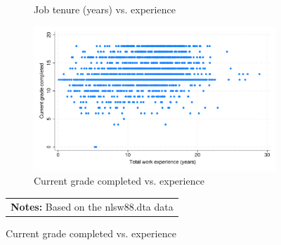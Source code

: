\documentclass{article}
\begin{document}
\begin{figure}[H]
\begin{subfigure}{.45\textwidth}
  \caption{Job tenure (years) vs. experience}
\end{subfigure}
\begin{subfigure}{.45\textwidth}
  \includegraphics[width = 1.00\textwidth]{./figures/scatter_grade.pdf}  
  \caption{Current grade completed vs. experience}
\end{subfigure}
\begin{tabular}{p{6in}}  
 \footnotesize \vspace{2pt} 
 \textbf{Notes:} Based on the nlsw88.dta data 
\end{tabular} 
\end{figure} 
\end{document}
